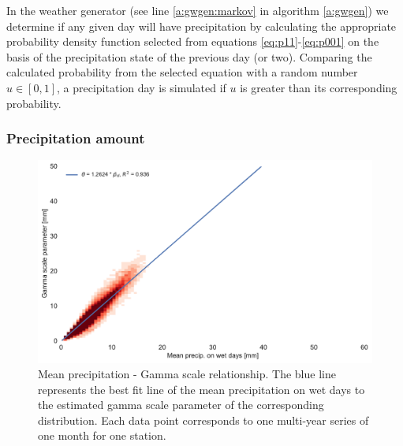 \documentclass[
11pt, %
english, %
singlespacing, %
headsepline, %
]{MastersDoctoralThesis} %
\begin{document}
\begin{NoHyper}
\begin{refsection}
In the weather generator (see line \ref{a:gwgen:markov} in algorithm \ref{a:gwgen}) we determine if any given day will have precipitation by calculating the appropriate probability density function selected from  equations \eqref{eq:p11}-\eqref{eq:p001} on the basis of the precipitation state of the previous day (or two). Comparing the calculated probability from the selected equation with a random number $u\in[0, 1]$, a precipitation day is simulated if $u$ is greater than its corresponding probability.

\subsubsection{Precipitation amount} \label{sec:dist_params}

\begin{figure}
	\includegraphics[width=\linewidth]{gwgen-figures/f04.pdf}
	\caption[Mean precipitation - Gamma scale relationship]{Mean precipitation - Gamma scale relationship. The blue line represents the best fit line of the mean precipitation on wet days to the estimated gamma scale parameter of the corresponding distribution. Each data point corresponds to one multi-year series of one month for one station.}
	\label{fig:gscale_meanw}
\end{figure}


\end{refsection}
\end{NoHyper}
\end{document}
